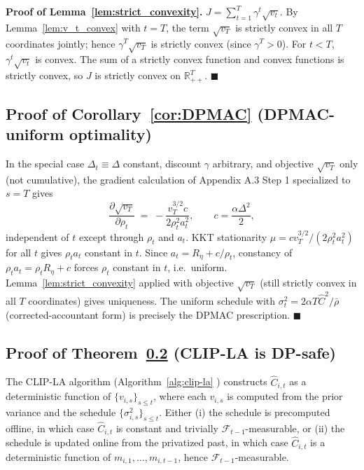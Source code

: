 \documentclass{article}
\begin{document}
\noindent \hspace{0.3cm} \textbf{Proof of Lemma~\ref{lem:strict_convexity}.} $J = \sum_{t=1}^T \gamma^t \sqrt{v_t}$. By Lemma~\ref{lem:v_t_convex} with $t = T$, the term $\sqrt{v_T}$ is strictly convex in all $T$ coordinates jointly; hence $\gamma^T \sqrt{v_T}$ is strictly convex (since $\gamma^T > 0$). For $t < T$, $\gamma^t\sqrt{v_t}$ is convex. The sum of a strictly convex function and convex functions is strictly convex, so $J$ is strictly convex on $\mathbb{R}_{++}^T$. $\blacksquare$

\subsection{Proof of Corollary~\ref{cor:DPMAC} (DPMAC-uniform optimality)}\label{app:DPMAC}

In the special case $\Delta_t \equiv \Delta$ constant, discount $\gamma$ arbitrary, and objective $\sqrt{v_T}$ only (not cumulative), the gradient calculation of Appendix A.3 Step 1 specialized to $s = T$ gives
$$\frac{\partial \sqrt{v_T}}{\partial \rho_t} \;=\; -\frac{v_T^{3/2} c}{2\rho_t^2 a_t^2}, \qquad c = \frac{\alpha\Delta^2}{2},$$
independent of $t$ except through $\rho_t$ and $a_t$. KKT stationarity $\mu = c v_T^{3/2}/(2\rho_t^2 a_t^2)$ for all $t$ gives $\rho_t a_t$ constant in $t$. Since $a_t = R_\eta + c/\rho_t$, constancy of $\rho_t a_t = \rho_t R_\eta + c$ forces $\rho_t$ constant in $t$, i.e.\ uniform. Lemma~\ref{lem:strict_convexity} applied with objective $\sqrt{v_T}$ (still strictly convex in all $T$ coordinates) gives uniqueness. The uniform schedule with $\sigma_t^2 = 2\alpha T \hat C^2/\bar\rho$ (corrected-accountant form) is precisely the DPMAC prescription. $\blacksquare$

\subsection{Proof of Theorem~\ref{app:CLIP-LA_safe} (CLIP-LA is DP-safe)}\label{app:CLIP-LA_safe}

The CLIP-LA algorithm (Algorithm~\ref{alg:clip-la} ) constructs $\hat C_{i,t}$ as a deterministic function of $\{v_{i,s}\}_{s \le t}$, where each $v_{i,s}$ is computed from the prior variance and the schedule $\{\sigma_{i,s}^2\}_{s \le t}$. Either (i) the schedule is precomputed offline, in which case $\hat C_{i,t}$ is constant and trivially $\mathcal{F}_{t-1}$-measurable, or (ii) the schedule is updated online from the privatized past, in which case $\hat C_{i,t}$ is a deterministic function of $m_{i,1}, \ldots, m_{i,t-1}$, hence $\mathcal{F}_{t-1}$-measurable.
\end{document}
